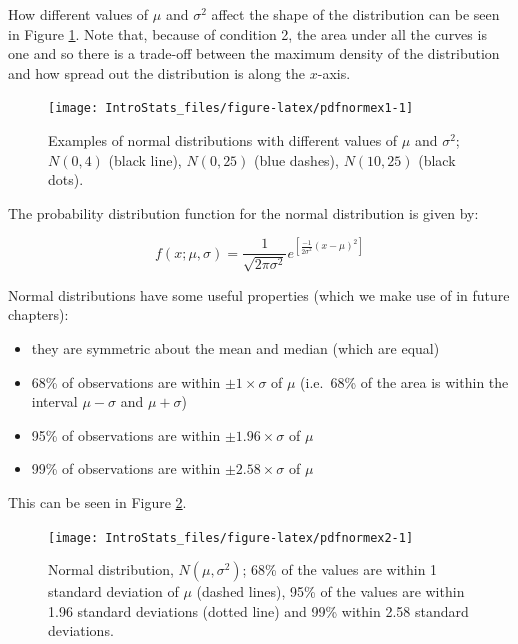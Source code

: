 \documentclass[
  oneside]{krantz}
\begin{document}
How different values of \(\mu\) and \(\sigma^2\) affect the shape of the distribution can be seen in Figure \ref{fig:pdfnormex1}. Note that, because of condition 2, the area under all the curves is one and so there is a trade-off between the maximum density of the distribution and how spread out the distribution is along the \(x\)-axis.



\begin{figure}

{\centering \texttt{[image: IntroStats\_files/figure-latex/pdfnormex1-1]} 

}

\caption{Examples of normal distributions with different values of \(\mu\) and \(\sigma^2\); \(N(0,4)\) (black line), \(N(0,25)\) (blue dashes), \(N(10, 25)\) (black dots).}\label{fig:pdfnormex1}
\end{figure}

The probability distribution function for the normal distribution is given by:

\begin{equation}
f(x; \mu, \sigma) = \frac{1}{\sqrt{2\pi\sigma^2}}e^{[\frac{-1}{2\sigma^2}(x-\mu)^2]}
\end{equation}

Normal distributions have some useful properties (which we make use of in future chapters):

\begin{itemize}
\item
  they are symmetric about the mean and median (which are equal)
\item
  68\% of observations are within \(\pm 1 \times \sigma\) of \(\mu\) (i.e.~68\% of the area is within the interval \(\mu-\sigma\) and \(\mu + \sigma\))
\item
  95\% of observations are within \(\pm 1.96 \times \sigma\) of \(\mu\)
\item
  99\% of observations are within \(\pm 2.58 \times \sigma\) of \(\mu\)
\end{itemize}

This can be seen in Figure \ref{fig:pdfnormex2}.



\begin{figure}

{\centering \texttt{[image: IntroStats\_files/figure-latex/pdfnormex2-1]} 

}

\caption{Normal distribution, \(N(\mu, \sigma^2)\); 68\% of the values are within 1 standard deviation of \(\mu\) (dashed lines), 95\% of the values are within 1.96 standard deviations (dotted line) and 99\% within 2.58 standard deviations.}\label{fig:pdfnormex2}
\end{figure}
\end{document}
